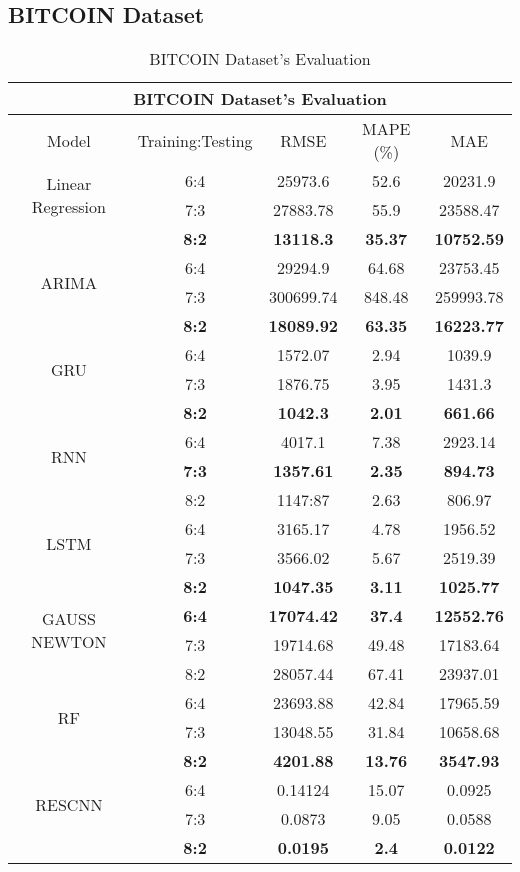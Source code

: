 \documentclass{ieeeojies}
\begin{document}
\subsection{BITCOIN Dataset} 
\begin{table}[H]
    \centering
    \caption{BITCOIN Dataset's Evaluation}
    \begin{tabular}{|c|c|c|c|c|}
         \hline
         \multicolumn{5}{|c|}{\textbf{BITCOIN Dataset's Evaluation}}\\
         \hline
         \centering Model & Training:Testing & RMSE & MAPE (\%) & MAE\\
         \hline
         \multirow{2}{*}{Linear Regression} & 6:4 & 25973.6 & 52.6 & 20231.9 \\ & 7:3 & 27883.78 & 55.9 & 23588.47 \\ & \textbf{8:2} & \textbf{13118.3} & \textbf{35.37} & \textbf{10752.59}\\
         \hline
         \multirow{2}{*}{ARIMA} & 6:4 & 29294.9 & 64.68 & 23753.45 \\ & 7:3 & 300699.74 & 848.48 & 259993.78 \\ & \textbf{8:2} & \textbf{18089.92} & \textbf{63.35} & \textbf{16223.77}\\
         \hline
         \multirow{2}{*}{GRU} & 6:4 & 1572.07 & 2.94 & 1039.9 \\ & 7:3 & 1876.75 & 3.95 & 1431.3 \\ & \textbf{8:2} & \textbf{1042.3} & \textbf{2.01} & \textbf{661.66}\\
         \hline
         \multirow{2}{*}{RNN} & 6:4 &  4017.1 &  7.38 & 2923.14 \\ & \textbf{7:3} & \textbf{1357.61} & \textbf{2.35} & \textbf{894.73}\\ & 8:2 & 1147:87 & 2.63 & 806.97 \\
         \hline
         \multirow{2}{*}{LSTM} & 6:4 & 3165.17 & 4.78 & 1956.52 \\ & 7:3 & 3566.02 & 5.67 & 2519.39 \\ & \textbf{8:2} & \textbf{1047.35} & \textbf{3.11} & \textbf{1025.77}\\
         \hline
         \multirow{2}{*}{GAUSS NEWTON} & \textbf{6:4} & \textbf{17074.42} & \textbf{37.4} & \textbf{12552.76}\\ & 7:3 & 19714.68 & 49.48 & 17183.64 \\ & 8:2 & 28057.44	& 67.41 & 23937.01 \\
         \hline
         \multirow{2}{*}{RF} & 6:4 & 23693.88 & 42.84 & 17965.59 \\ & 7:3 & 13048.55 & 31.84 & 10658.68 \\ & \textbf{8:2} &  	\textbf{4201.88} &	\textbf{13.76} & 	\textbf{3547.93} \\
         \hline
         \multirow{2}{*}{RESCNN} & 6:4 & 0.14124 & 15.07 & 0.0925 \\ & 7:3 & 0.0873 &  9.05 &  0.0588 \\ & \textbf{8:2} & \textbf{0.0195} & \textbf{2.4} & \textbf{0.0122}\\
         \hline
    \end{tabular}
    \label{bitcoinresult}
\end{table}
\end{document}
